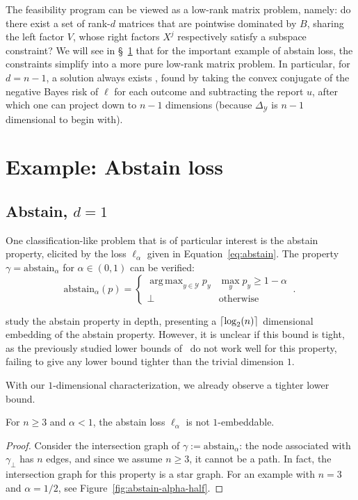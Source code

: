 \documentclass[final]{colt2020} %
\newcommand{\abstain}[1]{\mathrm{abstain}_{#1}}
\newcommand{\simplex}{\Delta_\Y}
\newcommand{\Y}{\mathcal{Y}}
\newcommand{\ellabs}[1]{\ell_{#1}}
\DeclarePairedDelimiter\ceil{\lceil}{\rceil}
\DeclareMathOperator*{\argmax}{arg\,max}
\begin{document}
The feasibility program can be viewed as a low-rank matrix problem, namely: do there exist a set of rank-$d$ matrices that are pointwise dominated by $B$, sharing the left factor $V$, whose right factors $X^j$ respectively satisfy a subspace constraint?
We will see in \S~\ref{sec:examples} that for the important example of abstain loss, the constraints simplify into a more pure low-rank matrix problem.
In particular, for $d=n-1$, a solution always exists \citep[Theorem 2]{finocchiaro2019embedding}, found by taking the convex conjugate of the negative Bayes risk of $\ell$ for each outcome and subtracting the report $u$, after which one can project down to $n-1$ dimensions (because $\simplex$ is $n-1$ dimensional to begin with).



\section{Example: Abstain loss}\label{sec:examples}
\subsection{Abstain, $d=1$}\label{subsec:abstain-d1}
One classification-like problem that is of particular interest is the abstain property, elicited by the loss $\ellabs{\alpha}$ given in Equation~\eqref{eq:abstain}.
The property $\gamma = \abstain{\alpha}$ for $\alpha \in (0,1)$ can be verified:
\begin{equation}\label{eq:abstain-prop}
     \abstain{\alpha}(p) = \begin{cases}
     \argmax_{y \in \Y} p_y & \max_y p_y \geq 1 - \alpha\\
     \bot & \text{otherwise}
     \end{cases}~.~
\end{equation}

\citet{ramaswamy2018consistent} study the abstain property in depth, presenting a $\ceil {\log_2(n)}$ dimensional embedding of the abstain property.
However, it is unclear if this bound is tight, as the previously studied lower bounds of~\citet{ramaswamy2016convex} do not work well for this property, failing to give any lower bound tighter than the trivial dimension $1$.

With our $1$-dimensional characterization, we already observe a tighter lower bound.
\begin{proposition}
	For $n \geq 3$ and $\alpha < 1$, the abstain loss $\ell_{\alpha}$ is not $1$-embeddable.
\end{proposition}
\begin{proof}
	Consider the intersection graph of $\gamma := \abstain{\alpha}$: the node associated with $\gamma_\bot$ has $n$ edges, and since we assume $n \geq 3$, it cannot be a path.
	In fact, the intersection graph for this property is a star graph.
	For an example with $n=3$ and $\alpha = 1/2$, see Figure~\ref{fig:abstain-alpha-half}.
\end{proof}
\end{document}
